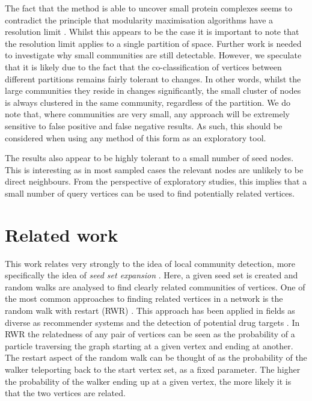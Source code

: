 \documentclass[sigconf]{acmart}
\begin{document}
The fact that the method is able to uncover small protein complexes seems to contradict the principle that modularity maximisation algorithms have a resolution limit \cite{fortunato2007resolution}.
Whilst this appears to be the case it is important to note that the resolution limit applies to a single partition of space.
Further work is needed to investigate why small communities are still detectable.
However, we speculate that it is likely due to the fact that the co-classification of vertices between different partitions remains fairly tolerant to changes.
In other words, whilst the large communities they reside in changes significantly, the small cluster of nodes is always clustered in the same community, regardless of the partition.
We do note that, where communities are very small, any approach will be extremely sensitive to false positive and false negative results.
As such, this should be considered when using any method of this form as an exploratory tool.

The results also appear to be highly tolerant to a small number of seed nodes.
This is interesting as in most sampled cases the relevant nodes are unlikely to be direct neighbours.
From the perspective of exploratory studies, this implies that a small number of query vertices can be used to find potentially related vertices.

\section{Related work}
\label{sec:related_work}
This work relates very strongly to the idea of local community detection, more specifically the idea of \textit{seed set expansion} \cite{gleich2012vertex}.
Here, a given seed set is created and random walks are analysed to find clearly related communities of vertices.
One of the most common approaches to finding related vertices in a network is the random walk with restart (RWR) \cite{can2005analysis, kohler2008walking}.
This approach has been applied in fields as diverse as recommender systems and the detection of potential drug targets \cite{chen2012drug}.
In RWR the relatedness of any pair of vertices can be seen as the probability of a particle traversing the graph starting at a given vertex and ending at another.
The restart aspect of the random walk can be thought of as the probability of the walker teleporting back to the start vertex set, as a fixed parameter. 
The higher the probability of the walker ending up at a given vertex, the more likely it is that the two vertices are related.
\end{document}
